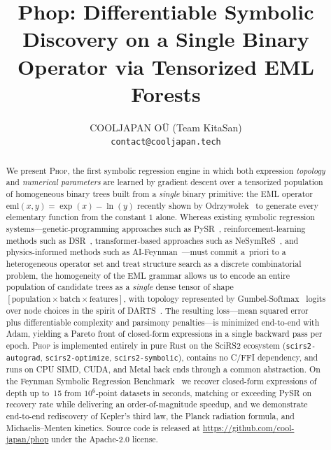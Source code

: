\documentclass{article}
\title{Phop: Differentiable Symbolic Discovery on a Single Binary Operator
       via Tensorized EML Forests}
\author{%
  COOLJAPAN O\"U (Team KitaSan)\\
  \texttt{contact@cooljapan.tech}
}
\begin{document}
\maketitle

\begin{abstract}
We present \textsc{Phop}, the first symbolic regression engine in which
both expression \emph{topology} and \emph{numerical parameters} are
learned by gradient descent over a tensorized population of homogeneous
binary trees built from a \emph{single} binary primitive: the EML
operator $\mathrm{eml}(x,y)=\exp(x)-\ln(y)$ recently shown by
Odrzywo\l{}ek~\cite{odrzywolek2026eml} to generate every elementary
function from the constant $1$ alone. Whereas existing symbolic
regression systems—genetic-programming approaches such as
PySR~\cite{cranmer2023pysr,schmidt2009eureqa}, reinforcement-learning
methods such as DSR~\cite{petersen2021dsr}, transformer-based approaches
such as NeSymReS~\cite{biggio2021nesymres}, and physics-informed methods
such as AI-Feynman~\cite{udrescu2020aifeynman,udrescu2020aifeynman2}—must
commit a~priori to a heterogeneous operator set and treat structure
search as a discrete combinatorial problem, the homogeneity of the EML
grammar allows us to encode an entire population of candidate trees as a
\emph{single} dense tensor of shape
$[\text{population}\times\text{batch}\times\text{features}]$, with
topology represented by Gumbel-Softmax~\cite{jang2017gumbel} logits over
node choices in the spirit of DARTS~\cite{liu2019darts}. The resulting
loss—mean squared error plus differentiable complexity and parsimony
penalties—is minimized end-to-end with Adam, yielding a Pareto front of
closed-form expressions in a single backward pass per epoch.
\textsc{Phop} is implemented entirely in pure Rust on the SciRS2
ecosystem (\texttt{scirs2-autograd}, \texttt{scirs2-optimize},
\texttt{scirs2-symbolic}), contains no C/FFI dependency, and runs on
CPU SIMD, CUDA, and Metal back ends through a common abstraction.
On the Feynman Symbolic Regression Benchmark~\cite{udrescu2020aifeynman}
we recover closed-form expressions of depth up to~15 from $10^6$-point
datasets in seconds, matching or exceeding PySR on recovery rate while
delivering an order-of-magnitude speedup, and we demonstrate end-to-end
rediscovery of Kepler's third law, the Planck radiation formula, and
Michaelis--Menten kinetics. Source code is released at
\url{https://github.com/cool-japan/phop} under the Apache-2.0 license.
\end{abstract}
\end{document}
